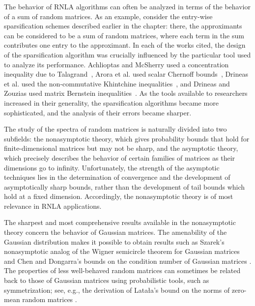  The 
 behavior of RNLA algorithms can often be analyzed in terms of the behavior
 of a sum of random matrices. As an example, consider the entry-wise
 sparsification schemes described earlier in the chapter: there, the 
 approximants can be considered to be a sum of random matrices, where
 each term in the sum contributes one entry to the approximant. In each
 of the works cited, the design of the sparsification algorithm was
 crucially influenced by the particular tool used to analyze its performance.
 Achlioptas and McSherry used a concentration inequality due to Talagrand~\cite{AM01,AM07},
 Arora et al. used scalar Chernoff bounds~\cite{AHK06}, Drineas et al. used the non-commutative
 Khintchine inequalities~\cite{DNT10}, and Drineas and Zouzias used
 matrix Bernstein inequalities~\cite{DZ11}. As the tools available to researchers 
 increased in their generality, the sparsification algorithms became more sophisticated, 
 and the analysis of their errors became sharper.

The study of the spectra of random matrices is naturally divided into two 
subfields: the nonasymptotic theory, which gives probability bounds that hold 
for finite-dimensional matrices but may not be sharp, and the asymptotic theory,
which precisely describes the behavior of certain families of matrices as their 
 dimensions go to infinity. Unfortunately, the strength of the asymptotic techniques lies in the 
determination of convergence and the development of asymptotically sharp bounds, rather than
the development of tail bounds which hold at a fixed dimension. Accordingly,
the nonasymptotic theory is of most relevance in RNLA applications. 
 
  
The sharpest and most comprehensive
results available in the nonasymptotic theory concern the behavior of Gaussian
matrices. The amenability of the Gaussian distribution makes it possible to
obtain results such as Szarek's nonasymptotic analog of the Wigner semicircle
theorem for Gaussian matrices \cite{Sza90} and Chen and Dongarra's bounds on the
condition number of Gaussian matrices \cite{ChenDongarra05}.
The properties of less well-behaved random matrices can sometimes be related
back to those of Gaussian matrices using probabilistic tools, such as
symmetrization; see, e.g., the derivation of Lata{\l}a's bound on the norms of
zero-mean random matrices \cite{Lat04}. 

